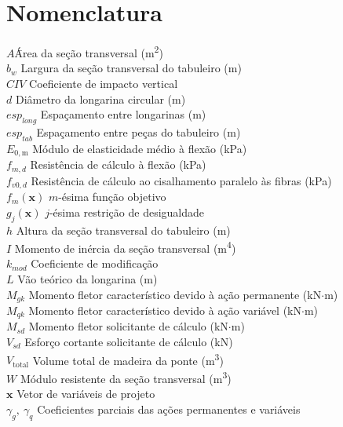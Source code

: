 \section*{Nomenclatura}

\begin{tabbing}
$A$\qquad\qquad \= Área da seção transversal (m\textsuperscript{2})\\
$b_w$ \> Largura da seção transversal do tabuleiro (m)\\
$CIV$ \> Coeficiente de impacto vertical\\
$d$ \> Diâmetro da longarina circular (m)\\
$esp_{long}$ \> Espaçamento entre longarinas (m)\\
$esp_{tab}$ \> Espaçamento entre peças do tabuleiro (m)\\
$E_{0,\mathrm{m}}$ \> Módulo de elasticidade médio à flexão (kPa)\\
$f_{m,d}$ \> Resistência de cálculo à flexão (kPa)\\
$f_{v0,d}$ \> Resistência de cálculo ao cisalhamento paralelo às fibras (kPa)\\
$f_m(\mathbf{x})$ \> $m$-ésima função objetivo\\
$g_j(\mathbf{x})$ \> $j$-ésima restrição de desigualdade\\
$h$ \> Altura da seção transversal do tabuleiro (m)\\
$I$ \> Momento de inércia da seção transversal (m\textsuperscript{4})\\
$k_{mod}$ \> Coeficiente de modificação\\
$L$ \> Vão teórico da longarina (m)\\
$M_{gk}$ \> Momento fletor característico devido à ação permanente (kN$\cdot$m)\\
$M_{qk}$ \> Momento fletor característico devido à ação variável (kN$\cdot$m)\\
$M_{sd}$ \> Momento fletor solicitante de cálculo (kN$\cdot$m)\\
$V_{sd}$ \> Esforço cortante solicitante de cálculo (kN)\\
$V_{\mathrm{total}}$ \> Volume total de madeira da ponte (m\textsuperscript{3})\\
$W$ \> Módulo resistente da seção transversal (m\textsuperscript{3})\\
$\mathbf{x}$ \> Vetor de variáveis de projeto\\
$\gamma_g,\ \gamma_q$ \> Coeficientes parciais das ações permanentes e variáveis\\

\end{tabbing}
